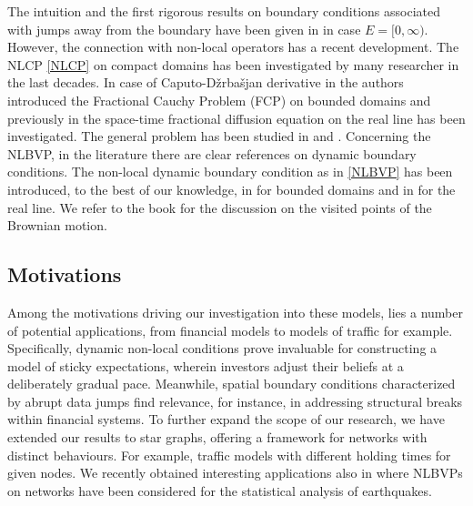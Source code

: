 \documentclass[11pt,a4paper]{article}
\theoremstyle{plain}
\theoremstyle{definition}
\theoremstyle{remark}
\begin{document}
	The intuition and the first rigorous results on boundary conditions associated with jumps away from the boundary have been given in \cite{feller1952parabolic, ito1963brownian} in case $E=[0, \infty)$. However, the connection with non-local operators has a recent development. The NLCP \eqref{NLCP} on compact domains has been investigated by many researcher in the last decades. In case of Caputo-D\v{z}rba\v{s}jan derivative in \cite{MNV09} the authors introduced the Fractional Cauchy Problem (FCP) on bounded domains and previously in \cite{MaLuPa2001} the space-time fractional diffusion equation on the real line has been investigated. The general problem has been studied in \cite{kochubei2011general} and \cite{toaldo2015convolution}. Concerning the NLBVP, in the literature there are clear references on dynamic boundary conditions. The non-local dynamic boundary condition as in \eqref{NLBVP} has been introduced, to the best of our knowledge, in \cite{d2024fractionalsticky} for bounded domains and in \cite{d2022fractional,d2022fractionalsticky} for the real line. We refer to the book \cite{bookMorPer} for the discussion on the visited points of the Brownian motion.\\
	
	
	
	
	
	
	\subsection{Motivations} Among the motivations driving our investigation into these models, lies a number of potential applications, from financial models to models of traffic for example. Specifically, dynamic non-local conditions prove invaluable for constructing a model of sticky expectations, wherein investors adjust their beliefs at a deliberately gradual pace. Meanwhile, spatial boundary conditions characterized by abrupt data jumps find relevance, for instance, in addressing structural breaks within financial systems. To further expand the scope of our research, we have extended our results to star graphs, offering a framework for networks with distinct behaviours. For example, traffic models with different holding times for given nodes. We recently obtained interesting applications also in \cite{ColDovTav} where NLBVPs on networks have been considered for the statistical analysis of earthquakes.\\
	
	
	
\end{document}
